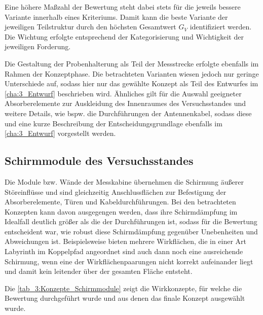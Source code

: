 Eine höhere Maßzahl der Bewertung steht dabei stets für die jeweils bessere Variante innerhalb eines Kriteriums. Damit kann die beste Variante der jeweiligen Teilstruktur durch den höchsten Gesamtwert $G_V$ identifiziert werden. Die Wichtung erfolgte entsprechend der Kategorisierung und Wichtigkeit der jeweiligen Forderung.
\par
\vspace{\linespace}
Die Gestaltung der Probenhalterung als Teil der Messstrecke erfolgte ebenfalls im Rahmen der Konzeptphase. Die betrachteten Varianten wiesen jedoch nur geringe Unterschiede auf, sodass hier nur das gewählte Konzept als Teil des Entwurfes im \Abschnitt\ref{cha:3_Entwurf} beschrieben wird. Ähnliches gilt für die Auswahl geeigneter Absorberelemente zur Auskleidung des Innenraumes des Versuchsstandes und weitere Details, wie bspw. die Durchführungen der Antennenkabel, sodass diese und eine kurze Beschreibung der Entscheidungsgrundlage ebenfalls im \Abschnitt\ref{cha:3_Entwurf} vorgestellt werden.


\subsection{Schirmmodule des Versuchsstandes}\label{cha:3_sub_Schirmmodule_Versuchsstand}

Die Module bzw. Wände der Messkabine übernehmen die Schirmung äußerer Störeinflüsse und sind gleichzeitig Anschlussflächen zur Befestigung der Absorberelemente, Türen und Kabeldurchführungen. Bei den betrachteten Konzepten kann davon ausgegengen werden, dass ihre Schirmdämpfung im Idealfall deutlich größer als die der Durchführungen ist, sodass für die Bewertung entscheident war, wie robust diese Schirmdämpfung gegenüber Unebenheiten und Abweichungen ist. Beispielsweise bieten mehrere Wirkflächen, die in einer Art Labyrinth im Koppelpfad angeordnet sind auch dann noch eine ausreichende Schirmung, wenn eine der Wirkflächenpaarungen nicht korrekt aufeinander liegt und damit kein leitender über der gesamten Fläche entsteht. 
\par
\vspace{\linespace}
Die \Tabelle\ref{tab_3:Konzepte_Schirmmodule} zeigt die Wirkkonzepte, für welche die Bewertung durchgeführt wurde und aus denen das finale Konzept ausgewählt wurde. 


